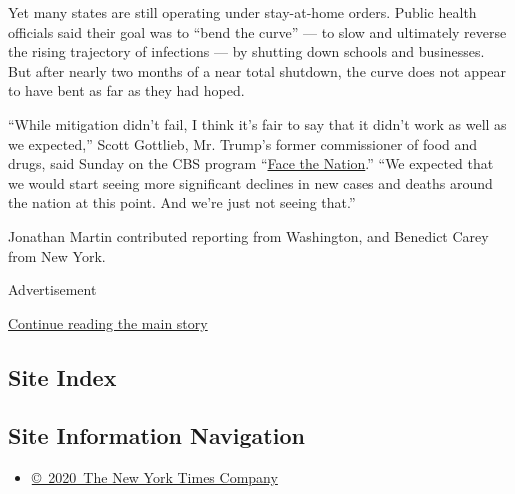 Yet many states are still operating under stay-at-home orders. Public
health officials said their goal was to ``bend the curve'' --- to slow
and ultimately reverse the rising trajectory of infections --- by
shutting down schools and businesses. But after nearly two months of a
near total shutdown, the curve does not appear to have bent as far as
they had hoped.

``While mitigation didn't fail, I think it's fair to say that it didn't
work as well as we expected,'' Scott Gottlieb, Mr. Trump's former
commissioner of food and drugs, said Sunday on the CBS program
``\href{https://www.cbsnews.com/news/transcript-scott-gottlieb-discusses-coronavirus-on-face-the-nation-may-3-2020/}{Face
the Nation}.'' ``We expected that we would start seeing more significant
declines in new cases and deaths around the nation at this point. And
we're just not seeing that.''

Jonathan Martin contributed reporting from Washington, and Benedict
Carey from New York.

Advertisement

\protect\hyperlink{after-bottom}{Continue reading the main story}

\hypertarget{site-index}{%
\subsection{Site Index}\label{site-index}}

\hypertarget{site-information-navigation}{%
\subsection{Site Information
Navigation}\label{site-information-navigation}}

\begin{itemize}
\tightlist
\item
  \href{https://help.nytimes.com/hc/en-us/articles/115014792127-Copyright-notice}{©~2020~The
  New York Times Company}
\end{itemize}

